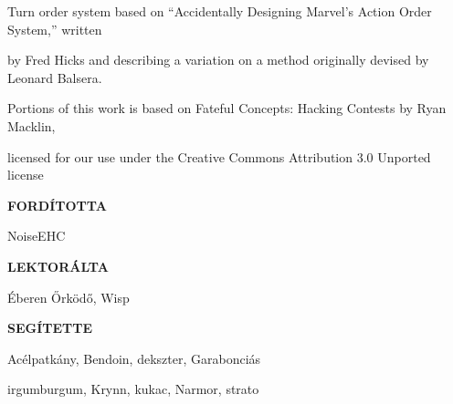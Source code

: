 \begin{center}
Turn order system based on “Accidentally Designing Marvel’s Action Order System,” written

by Fred Hicks and describing a variation on a method originally devised by Leonard Balsera.

Portions of this work is based on Fateful Concepts: Hacking Contests by Ryan Macklin,

licensed for our use under the Creative Commons Attribution 3.0 Unported license

\vspace{2em}

\textbf{FORDÍTOTTA}

NoiseEHC

\textbf{LEKTORÁLTA}

Éberen Őrködő, Wisp

\textbf{SEGÍTETTE}

Acélpatkány, Bendoin, dekszter, Garabonciás

irgumburgum, Krynn, kukac, Narmor, strato
\end{center}
